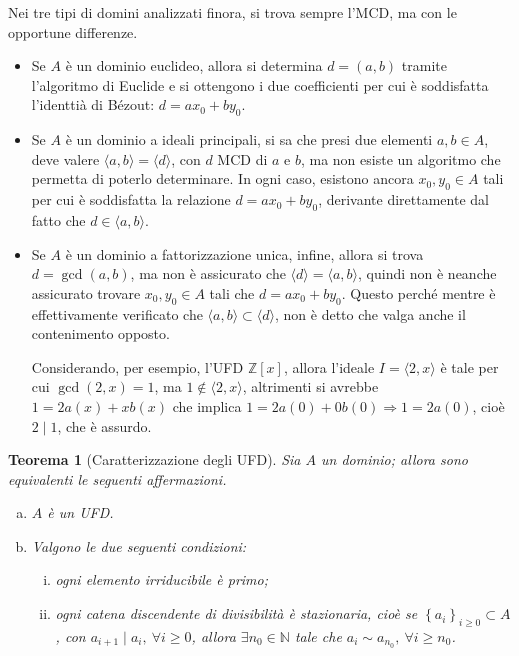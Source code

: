 \documentclass[12pt]{scrartcl}
\theoremstyle{style}
\newtheorem{teorema}{Teorema}[section]
\numberwithin{equation}{subsection}
\begin{document}
\noindent Nei tre tipi di domini analizzati finora, si trova sempre l'MCD, ma con le opportune differenze.
\begin{itemize}
	\item Se $A$ \`e un dominio euclideo, allora si determina $d = (a,b)$ tramite l'algoritmo di Euclide e si ottengono i due coefficienti per cui \`e soddisfatta l'identti\`a di B\'ezout: $d = ax_0 + by_0$.
	\item Se $A$ \`e un dominio a ideali principali, si sa che presi due elementi $a,b \in A$, deve valere $\langle a,b \rangle= \langle d \rangle$, con $d$ MCD di $a$ e $b$, ma non esiste un algoritmo che permetta di poterlo determinare.
		In ogni caso, esistono ancora $x_0,y_0 \in A$ tali per cui \`e soddisfatta la relazione $d = ax_0+by_0$, derivante direttamente dal fatto che $d \in  \langle a,b \rangle$.
	\item Se $A$ \`e un dominio a fattorizzazione unica, infine, allora si trova $d = \operatorname{gcd}(a,b) $, ma non \`e assicurato che $\langle d \rangle=\langle a,b \rangle$, quindi non \`e neanche assicurato trovare $x_0,y_0\in A$ tali che $d = ax_0+by_0$.
		Questo perch\'e mentre \`e effettivamente verificato che $\langle a,b \rangle\subset \langle d \rangle$, non \`e detto che valga anche il contenimento opposto.

			Considerando, per esempio, l'UFD $\mathbb{Z}[x]$, allora l'ideale $I = \langle 2,x \rangle$ \`e tale per cui $\operatorname{gcd}(2,x)=1$, ma $1 \not \in \langle 2,x \rangle$, altrimenti si avrebbe $1 =  2a(x) + xb(x)$ che implica $1 = 2a(0) + 0 b(0)\Rightarrow 1 = 2a(0)$, cio\`e $2  \mid 1$, che \`e assurdo.
\end{itemize}
\begin{teorema}
	[Caratterizzazione degli UFD]
	Sia $A$ un dominio; allora sono equivalenti le seguenti affermazioni.
	\begin{enumerate}[(a).]
		\item $A$ \`e un UFD.
		\item Valgono le due seguenti condizioni:
			\begin{enumerate}[(i).]
				\item ogni elemento irriducibile \`e primo;
				\item ogni catena discendente di divisibilit\`a \`e stazionaria, cio\`e se $\left\{ a_i \right\}_{i\ge 0}  \subset A$, con $a_{i+1}  \mid a_i, \ \forall i\ge 0$, allora $\exists n_0 \in \mathbb{N}$ tale che $a_i \sim a_{n_0} , \ \forall i\ge n_0$.
			\end{enumerate}
	\end{enumerate}
\end{teorema}
\end{document}
